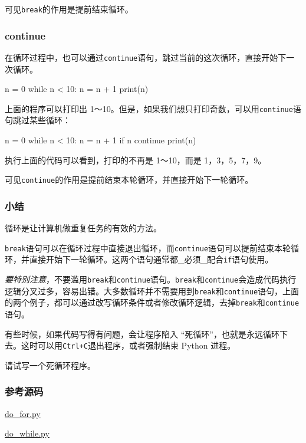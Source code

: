 可见\texttt{break}的作用是提前结束循环。

\hypertarget{continue}{%
\subsubsection{continue}\label{continue}}

在循环过程中，也可以通过\texttt{continue}语句，跳过当前的这次循环，直接开始下一次循环。

\begin{pythoncode}
n = 0
while n < 10:
    n = n + 1
    print(n)
\end{pythoncode}

上面的程序可以打印出
1～10。但是，如果我们想只打印奇数，可以用\texttt{continue}语句跳过某些循环：

\begin{pythoncode}
n = 0
while n < 10:
    n = n + 1
    if n %
        continue 
    print(n)
\end{pythoncode}

执行上面的代码可以看到，打印的不再是 1～10，而是 1，3，5，7，9。

可见\texttt{continue}的作用是提前结束本轮循环，并直接开始下一轮循环。

\hypertarget{ux5c0fux7ed3}{%
\subsubsection{小结}\label{ux5c0fux7ed3}}

循环是让计算机做重复任务的有效的方法。

\texttt{break}语句可以在循环过程中直接退出循环，而\texttt{continue}语句可以提前结束本轮循环，并直接开始下一轮循环。这两个语句通常都\_必须\_配合\texttt{if}语句使用。

\emph{要特别注意}，不要滥用\texttt{break}和\texttt{continue}语句。\texttt{break}和\texttt{continue}会造成代码执行逻辑分叉过多，容易出错。大多数循环并不需要用到\texttt{break}和\texttt{continue}语句，上面的两个例子，都可以通过改写循环条件或者修改循环逻辑，去掉\texttt{break}和\texttt{continue}语句。

有些时候，如果代码写得有问题，会让程序陷入
``死循环''，也就是永远循环下去。这时可以用\texttt{Ctrl+C}退出程序，或者强制结束
Python 进程。

请试写一个死循环程序。

\hypertarget{ux53c2ux8003ux6e90ux7801}{%
\subsubsection{参考源码}\label{ux53c2ux8003ux6e90ux7801}}

\href{https://github.com/michaelliao/learn-python3/blob/master/samples/basic/do_for.py}{do\_for.py}

\href{https://github.com/michaelliao/learn-python3/blob/master/samples/basic/do_while.py}{do\_while.py}

